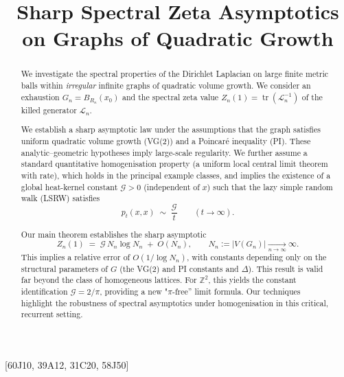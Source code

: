 \documentclass{article}
\numberwithin{equation}{section}
\theoremstyle{definition}
\theoremstyle{remark}
\newcommand{\cG}{\mathcal{G}}
\DeclareMathOperator{\tr}{tr}
\newcommand{\LL}{\mathcal{L}}
\begin{document}
\title{Sharp Spectral Zeta Asymptotics on Graphs of Quadratic Growth}



[60J10, 39A12, 31C20, 58J50]

\begin{abstract}
We investigate the spectral properties of the Dirichlet Laplacian on large finite metric balls within \emph{irregular} infinite graphs of quadratic volume growth.
We consider an exhaustion $G_n=B_{R_n}(x_0)$ and the spectral zeta value
$Z_n(1)=\tr(\LL_n^{-1})$ of the killed generator $\LL_n$.

We establish a sharp asymptotic law under the assumptions that the graph satisfies uniform quadratic volume growth (VG(2)) and a Poincaré inequality (PI). These analytic–geometric hypotheses imply large-scale regularity. We further assume a standard quantitative homogenisation property (a uniform local central limit theorem with rate), which holds in the principal example classes, and implies the existence of a global heat-kernel constant $\cG>0$ (independent of $x$) such that the lazy simple random walk (LSRW) satisfies
\[
  p_t(x,x)\;\sim\;\frac{\cG}{t}\qquad(t\to\infty).
\]

Our main theorem establishes the sharp asymptotic
\[
  Z_n(1)\;=\;\cG\,N_n\log N_n\;+\; O(N_n),\qquad N_n:=|V(G_n)|\xrightarrow[n\to\infty]{}\infty.
\]
This implies a relative error of $O(1/\log N_n)$, with constants depending only on the structural parameters of $G$ (the VG(2) and PI constants and $\Delta$).
This result is valid far beyond the class of homogeneous lattices.
For $\mathbb Z^2$, this yields the constant identification $\cG = 2/\pi$, providing a new "$\pi$-free'' limit formula.
Our techniques highlight the robustness of spectral asymptotics under homogenisation in this critical, recurrent setting.
\end{abstract}

\maketitle
\end{document}
